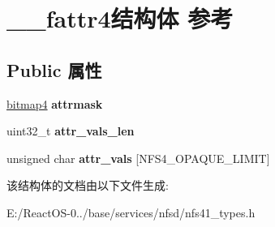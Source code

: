 \hypertarget{struct____fattr4}{}\section{\+\_\+\+\_\+fattr4结构体 参考}
\label{struct____fattr4}
\subsection*{Public 属性}
\begin{DoxyCompactItemize}
\item 
\mbox{\label{struct____fattr4_aec3e6a0b86038cd62798b1c5183c5856}} 
\hyperlink{struct____bitmap4}{bitmap4} {\bfseries attrmask}
\item 
\mbox{\label{struct____fattr4_a1645b7689395805465abe61f39fea39a}} 
uint32\+\_\+t {\bfseries attr\+\_\+vals\+\_\+len}
\item 
\mbox{\label{struct____fattr4_ad6cde3fa58b9dc7e5b868569b4b6a6c5}} 
unsigned char {\bfseries attr\+\_\+vals} \mbox{[}N\+F\+S4\+\_\+\+O\+P\+A\+Q\+U\+E\+\_\+\+L\+I\+M\+IT\mbox{]}
\end{DoxyCompactItemize}


该结构体的文档由以下文件生成\+:\begin{DoxyCompactItemize}
\item 
E\+:/\+React\+O\+S-\/0../base/services/nfsd/nfs41\+\_\+types.\+h\end{DoxyCompactItemize}
